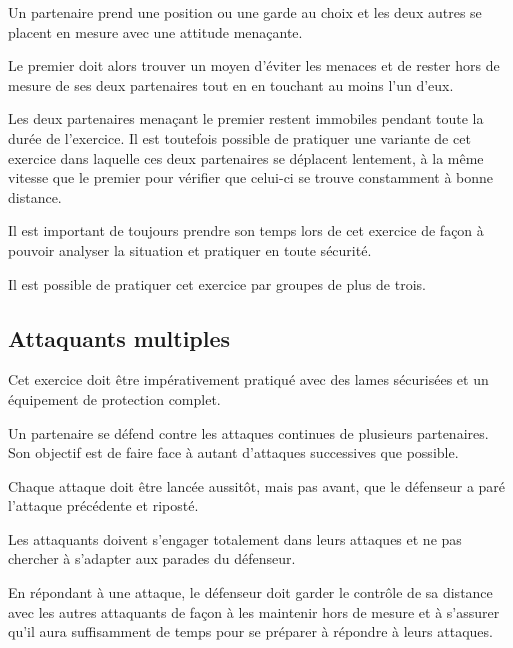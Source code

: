 Un partenaire prend une position ou une garde au choix et les deux autres se placent en mesure avec une attitude menaçante.

Le premier doit alors trouver un moyen d'éviter les menaces et de rester hors de mesure de ses deux partenaires tout en en touchant au moins l'un d'eux.

Les deux partenaires menaçant le premier restent immobiles pendant toute la durée de l'exercice.
Il est toutefois possible de pratiquer une variante de cet exercice dans laquelle ces deux partenaires se déplacent lentement, à la même vitesse que le premier pour vérifier que celui-ci se trouve constamment à bonne distance.

Il est important de toujours prendre son temps lors de cet exercice  de façon à pouvoir analyser la situation et pratiquer en toute sécurité.

Il est possible de pratiquer cet exercice par groupes de plus de trois.

\subsection{Attaquants multiples}
Cet exercice doit être impérativement pratiqué avec des lames sécurisées et un équipement de protection complet.

Un partenaire se défend contre les attaques continues de plusieurs partenaires.
Son objectif est de faire face à autant d'attaques successives que possible.

Chaque attaque doit être lancée aussitôt, mais pas avant, que le défenseur a paré l'attaque précédente et riposté.

Les attaquants doivent s'engager totalement dans leurs attaques et ne pas chercher à s'adapter aux parades du défenseur.

En répondant à une attaque, le défenseur doit garder le contrôle de sa distance avec les autres attaquants de façon à les maintenir hors de mesure et à s'assurer qu'il aura suffisamment de temps pour se préparer à répondre à leurs attaques.